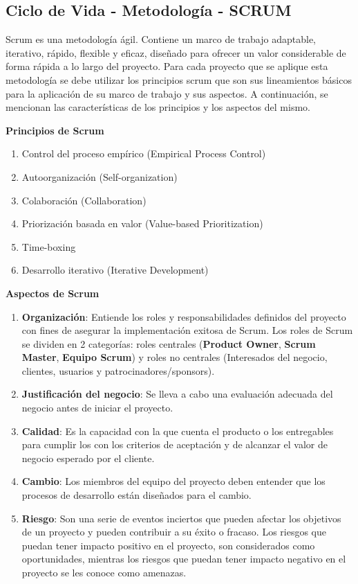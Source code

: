 \subsection{Ciclo de Vida - Metodología - SCRUM}

Scrum es una metodología ágil. Contiene un marco de trabajo adaptable, iterativo, rápido, flexible y eficaz, diseñado para ofrecer un valor considerable de forma rápida a lo largo del proyecto. Para cada proyecto que se aplique esta metodología se debe utilizar los principios scrum que son sus lineamientos básicos para la aplicación de su marco de trabajo y sus aspectos. A continuación, se mencionan las características de los principios y los aspectos del mismo.

\textbf{Principios de Scrum}
\begin{enumerate}
    \item Control del proceso empírico (Empirical Process Control)
    \item Autoorganización (Self-organization)
    \item Colaboración (Collaboration)
    \item Priorización basada en valor (Value-based Prioritization)
    \item Time-boxing
    \item Desarrollo iterativo (Iterative Development)
\end{enumerate}

\textbf{Aspectos de Scrum}
\begin{enumerate}
    \item \textbf{Organización}: Entiende los roles y responsabilidades definidos del proyecto con fines de asegurar la implementación exitosa de Scrum. Los roles de Scrum se dividen en 2 categorías: roles centrales (\textbf{Product Owner}, \textbf{Scrum Master}, \textbf{Equipo Scrum}) y roles no centrales (Interesados del negocio, clientes, usuarios y patrocinadores/sponsors).  
    \item \textbf{Justificación del negocio}: Se lleva a cabo una evaluación adecuada del negocio antes de iniciar el proyecto.  
    \item \textbf{Calidad}: Es la capacidad con la que cuenta el producto o los entregables para cumplir los con los criterios de aceptación y de alcanzar el valor de negocio esperado por el cliente.  
    \item \textbf{Cambio}: Los miembros del equipo del proyecto deben entender que los procesos de desarrollo están diseñados para el cambio.  
    \item \textbf{Riesgo}: Son una serie de eventos inciertos que pueden afectar los objetivos de un proyecto y pueden contribuir a su éxito o fracaso. Los riesgos que puedan tener impacto positivo en el proyecto, son considerados como oportunidades, mientras los riesgos que puedan tener impacto negativo en el proyecto se les conoce como amenazas.
\end{enumerate}






